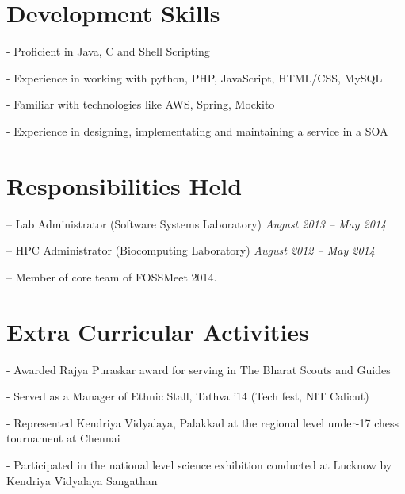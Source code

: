 \documentclass[margin,line]{resume}
\begin{document}
\begin{resume}
  
    \vspace{2mm}
    
    \section{\mysidestyle Development Skills} 
    	\begin{list2}
	\item[-] Proficient in Java, C and Shell Scripting
	\item[-] Experience in working with python, PHP, JavaScript, HTML/CSS, MySQL
	\item[-] Familiar with technologies like AWS, Spring, Mockito
	\item[-] Experience in designing, implementating and maintaining a service in a SOA
	\end{list2}
	
    
    \section{\mysidestyle Responsibilities Held } 
	
	\begin{list2}
	\item[--] Lab Administrator (Software Systems Laboratory) \hfill \textit{August 2013 -- May 2014}
	\item[--] HPC Administrator (Biocomputing Laboratory)  \hfill  \textit{August 2012 -- May 2014}
	\item[--] Member of core team of FOSSMeet 2014.
	\end{list2}
	
    \section{\mysidestyle Extra Curricular Activities} 
    	\begin{list2}
	\item[-] Awarded Rajya Puraskar award for serving in The Bharat Scouts and Guides
	\item[-] Served as a Manager of Ethnic Stall, Tathva '14 (Tech fest, NIT Calicut)
	\item[-] Represented Kendriya Vidyalaya, Palakkad at the regional level under-17 chess tournament at Chennai
	\item[-] Participated in the national level science exhibition conducted at Lucknow by Kendriya
Vidyalaya Sangathan
	\end{list2}

\end{resume}
\end{document}
